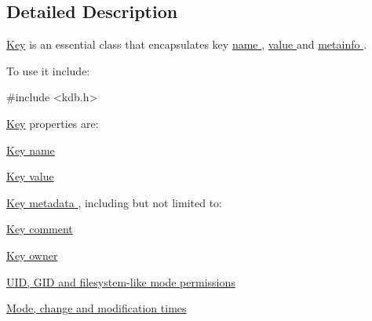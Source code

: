 \subsection{Detailed Description}
\hyperlink{classkdb_1_1Key}{Key} is an essential class that encapsulates key \hyperlink{group__keyname}{name }, \hyperlink{group__keyvalue}{value } and \hyperlink{group__keymeta}{metainfo }. 

To use it include\+: 
\begin{DoxyCode}
\textcolor{preprocessor}{#include <kdb.h>}
\end{DoxyCode}


\hyperlink{classkdb_1_1Key}{Key} properties are\+:
\begin{DoxyItemize}
\item \hyperlink{group__keyname}{Key name }
\item \hyperlink{group__keyvalue}{Key value }
\item \hyperlink{group__keymeta}{Key metadata }, including but not limited to\+:
\begin{DoxyItemize}
\item \hyperlink{group__meta_gafb89735689929ff717cc9f2d0d0b46a2}{Key comment }
\item \hyperlink{owner_8c_a35922a017bee8b4bcb493bbdfad9d6f5}{Key owner }
\item \hyperlink{group__keymeta}{U\+ID, G\+ID and filesystem-\/like mode permissions }
\item \hyperlink{group__keymeta}{Mode, change and modification times }
\end{DoxyItemize}
\end{DoxyItemize}

